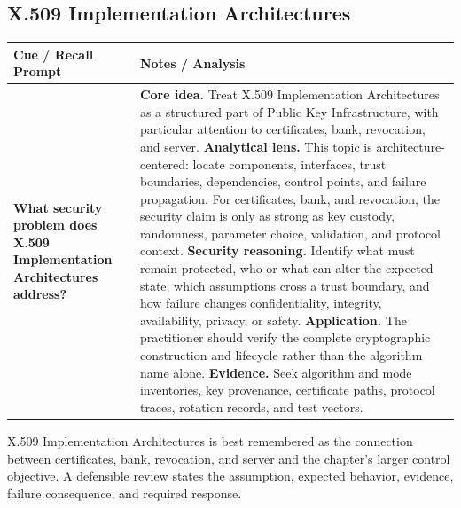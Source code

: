 \documentclass[11pt]{article}
\newcommand{\CornellHeader}{%
\rowcolor{Navy}\color{white}\bfseries Cue / Recall Prompt & \color{white}\bfseries Notes / Analysis\\\hline}
\newcommand{\CornellRow}[2]{%
\cellcolor{CueGray}\RaggedRight\textbf{#1} & \RaggedRight #2\\\hline}
\begin{document}
\subsection*{X.509 Implementation Architectures}
\begin{longtable}{>{\RaggedRight\arraybackslash}p{}|>{\RaggedRight\arraybackslash}p{}}
\CornellHeader
\CornellRow{What security problem does X.509 Implementation Architectures address?}{\textbf{Core idea.} Treat X.509 Implementation Architectures as a structured part of Public Key Infrastructure, with particular attention to certificates, bank, revocation, and server. \textbf{Analytical lens.} This topic is architecture-centered: locate components, interfaces, trust boundaries, dependencies, control points, and failure propagation. For certificates, bank, and revocation, the security claim is only as strong as key custody, randomness, parameter choice, validation, and protocol context. \textbf{Security reasoning.} Identify what must remain protected, who or what can alter the expected state, which assumptions cross a trust boundary, and how failure changes confidentiality, integrity, availability, privacy, or safety. \textbf{Application.} The practitioner should verify the complete cryptographic construction and lifecycle rather than the algorithm name alone. \textbf{Evidence.} Seek algorithm and mode inventories, key provenance, certificate paths, protocol traces, rotation records, and test vectors.}
\end{longtable}
\begin{topicsummary}
X.509 Implementation Architectures is best remembered as the connection between certificates, bank, revocation, and server and the chapter's larger control objective. A defensible review states the assumption, expected behavior, evidence, failure consequence, and required response.
\end{topicsummary}
\end{document}
